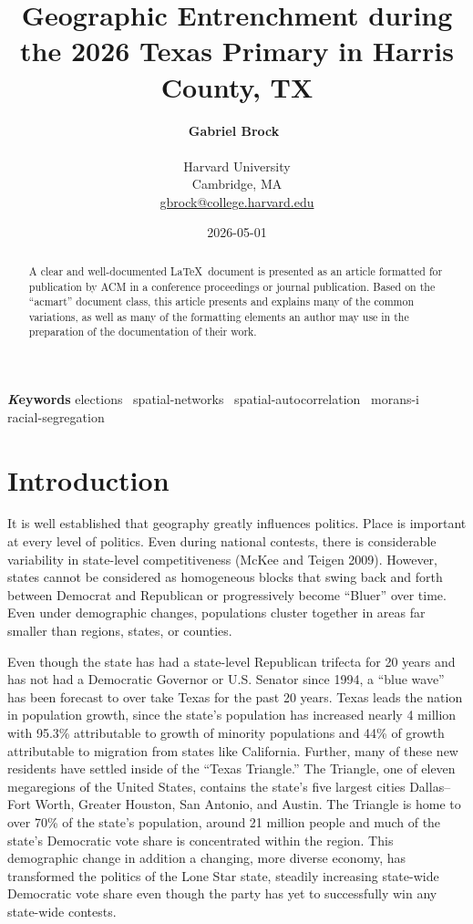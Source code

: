 \documentclass[
]{article}
\title{Geographic Entrenchment during the 2026 Texas Primary in Harris
County, TX}
\author{\textbf{Gabriel
Brock}~\orcidlink{0009-0005-6958-9516}\\\\Harvard University\\Cambridge,
MA\\\href{mailto:gbrock@college.harvard.edu}{gbrock@college.harvard.edu}}
\date{2026-05-01}
\begin{document}
\maketitle
\begin{abstract}
A clear and well-documented \LaTeX~document is presented as an article
formatted for publication by ACM in a conference proceedings or journal
publication. Based on the ``acmart'' document class, this article
presents and explains many of the common variations, as well as many of
the formatting elements an author may use in the preparation of the
documentation of their work.
\end{abstract}
{\bfseries \emph Keywords}
\def\sep{\textbullet\ }
elections \sep spatial-networks \sep spatial-autocorrelation \sep morans-i \sep 
racial-segregation



\section{Introduction}\label{introduction}

It is well established that geography greatly influences politics. Place
is important at every level of politics. Even during national contests,
there is considerable variability in state-level competitiveness (McKee
and Teigen 2009). However, states cannot be considered as homogeneous
blocks that swing back and forth between Democrat and Republican or
progressively become ``Bluer'' over time. Even under demographic
changes, populations cluster together in areas far smaller than regions,
states, or counties.

Even though the state has had a state-level Republican trifecta for 20
years and has not had a Democratic Governor or U.S. Senator since 1994,
a ``blue wave'' has been forecast to over take Texas for the past 20
years. Texas leads the nation in population growth, since the state's
population has increased nearly 4 million with 95.3\% attributable to
growth of minority populations and 44\% of growth attributable to
migration from states like California. Further, many of these new
residents have settled inside of the ``Texas Triangle.'' The Triangle,
one of eleven megaregions of the United States, contains the state's
five largest cities Dallas--Fort Worth, Greater Houston, San Antonio,
and Austin. The Triangle is home to over 70\% of the state's population,
around 21 million people and much of the state's Democratic vote share
is concentrated within the region. This demographic change in addition a
changing, more diverse economy, has transformed the politics of the Lone
Star state, steadily increasing state-wide Democratic vote share even
though the party has yet to successfully win any state-wide contests.
\end{document}
